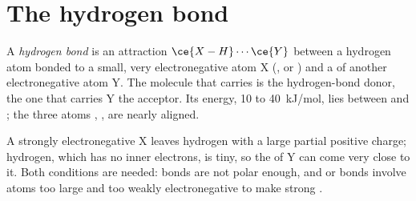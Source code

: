 \section{The hydrogen bond}

\begin{definition}\label{def:b1:intermolecular-forces-solvents:hbond}
A \emph{hydrogen bond} is an attraction
$\ce{X-H}\cdots\ce{Y}$ between a hydrogen atom bonded to a small, very
electronegative atom X (,  or ) and a  of
another electronegative atom Y. The molecule that carries  is the
hydrogen-bond donor, the one that carries Y the acceptor. Its energy, 10
to \qty{40}{kJ/mol}, lies between  and ; the three atoms , ,  are nearly aligned.
\end{definition}

\begin{remark}\label{rem:b1:intermolecular-forces-solvents:why}
A strongly electronegative X leaves hydrogen with a large partial
positive charge; hydrogen, which has no inner electrons, is tiny, so the
 of Y can come very close to it. Both conditions are needed:
 bonds are not polar enough, and  or  bonds
involve atoms too large and too weakly electronegative to make strong
.
\end{remark}

